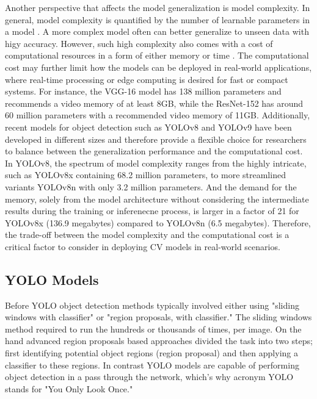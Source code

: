 Another perspective that affects the model generalization is model complexity. In general, model complexity is quantified by the number of learnable parameters in a model \cite{hu2021model}. A more complex model often can better generalize to unseen data with higy accuracy. However, such high complexity also comes with a cost of computational resources in a form of either memory or time \cite{justus2018predicting}. The computational cost may further limit how the models can be deployed in real-world applications, where real-time processing or edge computing is desired for fast or compact systems. For instance, the VGG-16 model \cite{simonyan2014very} has 138 million parameters and recommends a video memory of at least 8GB, while the ResNet-152 \cite{he2016deep} has around 60 million parameters with a recommended video memory of 11GB. Additionally, recent models for object detection such as YOLOv8 \cite{ultralyticsYOLOv8} and YOLOv9 \cite{wang2024yolov9} have been developed in different sizes and therefore provide a flexible choice for researchers to balance between the generalization performance and the computational cost. In YOLOv8, the spectrum of model complexity ranges from the highly intricate, such as YOLOv8x containing 68.2 million parameters, to more streamlined variants YOLOv8n with only 3.2 million parameters. And the demand for the memory, solely from the model architecture without considering the intermediate results during the training or inferenecne process, is larger in a factor of 21 for YOLOv8x (136.9 megabytes) compared to YOLOv8n (6.5 megabytes). Therefore, the trade-off between the model complexity and the computational cost is a critical factor to consider in deploying CV models in real-world scenarios.

\subsection*{YOLO Models}
Before YOLO object detection methods typically involved either using "sliding windows with classifier" or "region proposals, with classifier." The sliding windows method required to run the hundreds or thousands of times, per image. On the hand advanced region proposals based approaches divided the task into two steps; first identifying potential object regions (region proposal) and then applying a classifier to these regions. In contrast YOLO models are capable of performing object detection in a pass through the network, which's why acronym YOLO stands for "You Only Look Once."

